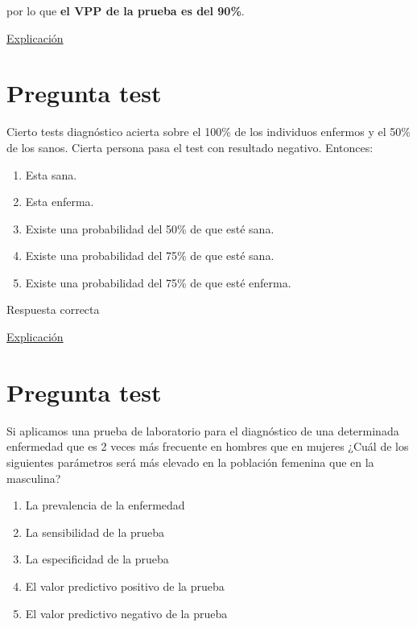 \documentclass[
]{book}
\providecommand{\tightlist}{%
  \setlength{\itemsep}{0pt}\setlength{\parskip}{0pt}}
\begin{document}
por lo que \textbf{el VPP de la prueba es del 90\%}.

\href{https://1fjmanzano.github.io/bioestadistica/relaci\%C3\%B3n-entre-variables-cualitativas.html\#diagno\%CC\%81stico-cli\%CC\%81nico}{Explicación}

\hypertarget{pregunta-test-157}{%
\section{Pregunta test}\label{pregunta-test-157}}

Cierto tests diagnóstico acierta sobre el 100\% de los individuos enfermos y el 50\% de los sanos. Cierta persona pasa el test con resultado negativo. Entonces:

\begin{enumerate}
\def\labelenumi{\alph{enumi})}
\tightlist
\item
  Esta sana.
\item
  Esta enferma.
\item
  Existe una probabilidad del 50\% de que esté sana.
\item
  Existe una probabilidad del 75\% de que esté sana.
\item
  Existe una probabilidad del 75\% de que esté enferma.
\end{enumerate}

Respuesta correcta

\href{https://1fjmanzano.github.io/bioestadistica/relaci\%C3\%B3n-entre-variables-cualitativas.html\#diagno\%CC\%81stico-cli\%CC\%81nico}{Explicación}

\hypertarget{pregunta-test-158}{%
\section{Pregunta test}\label{pregunta-test-158}}

Si aplicamos una prueba de laboratorio para el diagnóstico de una determinada enfermedad que es 2 veces más frecuente en hombres que en mujeres ¿Cuál de los siguientes parámetros será más elevado en la población femenina que en la masculina?

\begin{enumerate}
\def\labelenumi{\alph{enumi})}
\tightlist
\item
  La prevalencia de la enfermedad
\item
  La sensibilidad de la prueba
\item
  La especificidad de la prueba
\item
  El valor predictivo positivo de la prueba
\item
  El valor predictivo negativo de la prueba
\end{enumerate}
\end{document}

